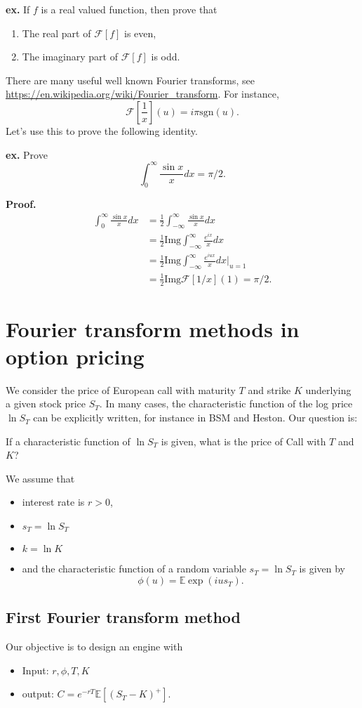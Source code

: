 \documentclass{article}
\begin{document}
{\bf ex.} If $f$ is a real valued function, then prove that
\begin{enumerate}
\item
The real part of $\mathcal F[f]$ is even,
\item The imaginary part of $\mathcal F[f]$ is odd.
\end{enumerate}


There are many useful well known Fourier transforms, see \url{https://en.wikipedia.org/wiki/Fourier_transform}.
For instance, 
$$\mathcal F[\frac 1 x](u) = i \pi \text{sgn}(u).$$
Let's use this to prove the following identity. 

{\bf ex.}
Prove $$\int_0^\infty \frac{\sin x}{x} dx = \pi/2.$$

{\bf Proof.}
$$
\begin{array}
{ll}
\int_0^\infty \frac{\sin x}{x} dx & = \frac 1 2 \int_{-\infty}^\infty \frac{\sin x}{x} dx
\\ & = 
\frac 1 2 \text{Img} \int_{-\infty}^\infty \frac{e^{ix}}{x} dx
\\ & = 
\frac 1 2 \text{Img} \int_{-\infty}^\infty \frac{e^{i u x}}{x} dx \Big|_{u = 1}
\\ & = 
\frac 1 2 \text{Img} \mathcal F[1/x](1) = \pi/2.
\end{array}
$$

\section{Fourier transform methods in option pricing}
We consider the price of European call with maturity $T$ and strike $K$ underlying a given stock price $S_T$.
In many cases, the characteristic function of the log price $\ln S_T$ can be explicitly written, for instance in BSM and Heston.
Our question is: 
\begin{center}
If a characteristic function of $\ln S_T$ is given, what is the price of Call with $T$ and $K$?
\end{center}

We assume that 
\begin{itemize}
\item
interest rate is $r>0$, 
\item $s_T = \ln S_T$
\item $k = \ln K$
\item and the characteristic function of a random variable $s_T = \ln S_T$ is given by
$$\phi(u) = \mathbb E \exp(iu s_T).$$
\end{itemize}
\subsection{ First Fourier transform method}
Our objective is to design an engine with
\begin{itemize}
\item
Input: $r, \phi, T, K$
\item
output: $C = e^{-rT} \mathbb E[(S_T - K)^+]$.
\end{itemize}
\end{document}
